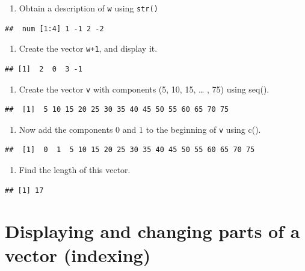 \documentclass[
]{book}
\providecommand{\tightlist}{%
  \setlength{\itemsep}{0pt}\setlength{\parskip}{0pt}}
\begin{document}
\begin{enumerate}
\def\labelenumi{\arabic{enumi}.}
\setcounter{enumi}{2}
\tightlist
\item
  Obtain a description of \texttt{w} using \texttt{str()}
\end{enumerate}

\begin{verbatim}
##  num [1:4] 1 -1 2 -2
\end{verbatim}

\begin{enumerate}
\def\labelenumi{\arabic{enumi}.}
\setcounter{enumi}{3}
\tightlist
\item
  Create the vector \texttt{w+1}, and display it.
\end{enumerate}

\begin{verbatim}
## [1]  2  0  3 -1
\end{verbatim}

\begin{enumerate}
\def\labelenumi{\arabic{enumi}.}
\setcounter{enumi}{4}
\tightlist
\item
  Create the vector \texttt{v} with components (5, 10, 15, \ldots{} , 75) using seq().
\end{enumerate}

\begin{verbatim}
##  [1]  5 10 15 20 25 30 35 40 45 50 55 60 65 70 75
\end{verbatim}

\begin{enumerate}
\def\labelenumi{\arabic{enumi}.}
\setcounter{enumi}{5}
\tightlist
\item
  Now add the components 0 and 1 to the beginning of \texttt{v} using c().
\end{enumerate}

\begin{verbatim}
##  [1]  0  1  5 10 15 20 25 30 35 40 45 50 55 60 65 70 75
\end{verbatim}

\begin{enumerate}
\def\labelenumi{\arabic{enumi}.}
\setcounter{enumi}{6}
\tightlist
\item
  Find the length of this vector.
\end{enumerate}

\begin{verbatim}
## [1] 17
\end{verbatim}

\section{Displaying and changing parts of a vector (indexing)}\label{displaying-and-changing-parts-of-a-vector-indexing}
\end{document}
